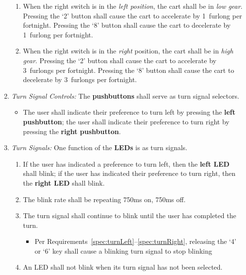 \begin{enumerate}
        \begin{enumerate}
            \item When the right switch is in the \textit{left position}, the cart shall be in \textit{low gear}.
                Pressing the `2' button shall cause the cart to accelerate by 1~furlong per fortnight.
                Pressing the `8' button shall cause the cart to decelerate by 1~furlong per fortnight.
            \item When the right switch is in the \textit{right} position, the cart shall be in \textit{high gear}.
                Pressing the `2' button shall cause the cart to accelerate by 3~furlongs per fortnight.
                Pressing the `8' button shall cause the cart to decelerate by 3~furlongs per fortnight.
        \end{enumerate}
    \item \label{spec:TurnSignalControls} \textit{Turn Signal Controls:} The \textbf{pushbuttons} shall serve as turn signal selectors.
        \begin{itemize}
            \item The user shall indicate their preference to turn left by pressing the \textbf{left pushbutton};
                the user shall indicate their preference to turn right by pressing the \textbf{right pushbutton}.
        \end{itemize}
    \item \label{spec:TurnSignals} \textit{Turn Signals:} One function of the \textbf{LEDs} is as turn signals.
        \begin{enumerate}
            \item If the user has indicated a preference to turn left, then the \textbf{left LED} shall blink;
                if the user has indicated their preference to turn right, then the \textbf{right LED} shall blink.
            \item \label{spec:blinkRate} The blink rate shall be repeating 750ms on, 750ms off.
            \item The turn signal shall continue to blink until the user has completed the turn.
                \begin{itemize}
                    \item Per Requirements~\ref{spec:turnLeft}--\ref{spec:turnRight}, releasing the `4' or `6' key shall cause a blinking turn signal to stop blinking
                \end{itemize}
            \item An LED shall not blink when its turn signal has not been selected.

\end{enumerate}
\end{enumerate}
